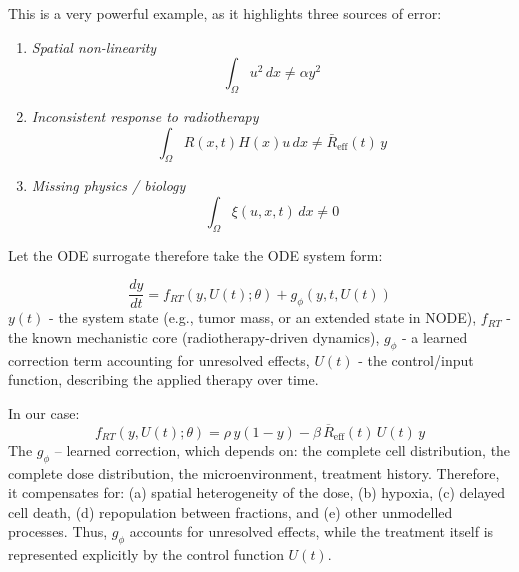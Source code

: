 This is a very powerful example, as it highlights three sources of
error:
\begin{enumerate}
\item \emph{Spatial non-linearity}
\begin{equation}
\int_{\Omega} u^{2}\,dx
\neq
\alpha y^{2}
\end{equation}
\item \emph{Inconsistent response to radiotherapy}
\begin{equation}
\int_{\Omega} R(x,t)H(x)u\,dx
\neq
\bar{R}_{\mathrm{eff}}(t)\,y
\end{equation}
\item \emph{Missing physics / biology}
\begin{equation}
\int_{\Omega} \xi(u,x,t)\,dx
\neq 0
\end{equation}
\end{enumerate}
Let the ODE surrogate therefore take the ODE system form:

\begin{equation}
\label{eq:pinode_residual}
\frac{dy}{dt}
=
f_{RT}\!\left(y,U(t);\theta\right)
+
g_{\phi}\!\left(y,t,U(t)\right)
\end{equation}
\(y(t)\) - the system state (e.g., tumor mass, or an extended
state in NODE),
\(f_{RT}\) - the known mechanistic core (radiotherapy-driven dynamics),
\(g_{\phi}\) - a learned correction term accounting for unresolved
effects,
\(U(t)\) - the control/input function, describing the applied therapy
over time.

In our case:
\begin{equation}
\label{eq:frt}
f_{RT}(y,U(t);\theta)
=
\rho\,y(1-y)
-
\beta\,\overline{R}_{\mathrm{eff}}(t)\,U(t)\,y
\end{equation}
The $g_{\phi}$ -- learned correction, which depends on: the
complete cell distribution, the complete dose distribution, the
microenvironment, treatment history. Therefore, it compensates for:
(a) spatial heterogeneity of the dose,
(b) hypoxia,
(c) delayed cell death,
(d) repopulation between fractions,
and (e) other unmodelled processes.
Thus, \(g_{\phi}\) accounts for unresolved effects, while the treatment
itself is represented explicitly by the control function \(U(t)\).

